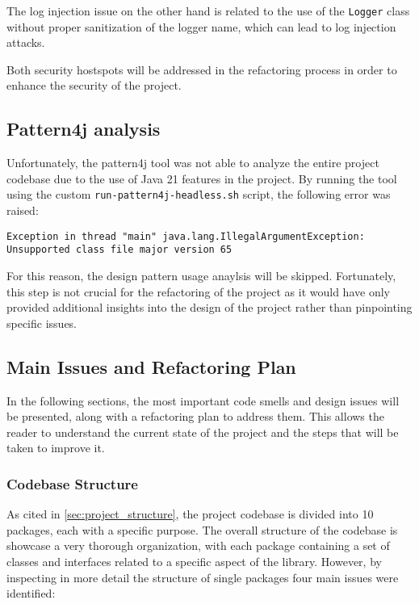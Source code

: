 The log injection issue on the other hand is related to the use of the \texttt{Logger} class without proper sanitization of the logger name, which can lead to log injection attacks.

Both security hostspots will be addressed in the refactoring process in order to enhance the security of the project.

\subsection{Pattern4j analysis}

Unfortunately, the pattern4j tool was not able to analyze the entire project codebase due to the use of Java 21 features in the project. By running the tool using the custom \texttt{run-pattern4j-headless.sh} script, the following error was raised:

\begin{verbatim}
Exception in thread "main" java.lang.IllegalArgumentException: Unsupported class file major version 65
\end{verbatim}

\noindent For this reason, the design pattern usage anaylsis will be skipped. Fortunately, this step is not crucial for the refactoring of the project as it would have only provided additional insights into the design of the project rather than pinpointing specific issues.

\subsection{Main Issues and Refactoring Plan}

In the following sections, the most important code smells and design issues will be presented, along with a refactoring plan to address them. This allows the reader to understand the current state of the project and the steps that will be taken to improve it.

\subsubsection{Codebase Structure}

As cited in \autoref{sec:project_structure}, the project codebase is divided into 10 packages, each with a specific purpose. The overall structure of the codebase is showcase a very thorough organization, with each package containing a set of classes and interfaces related to a specific aspect of the library. However, by inspecting in more detail the structure of single packages four main issues were identified:

